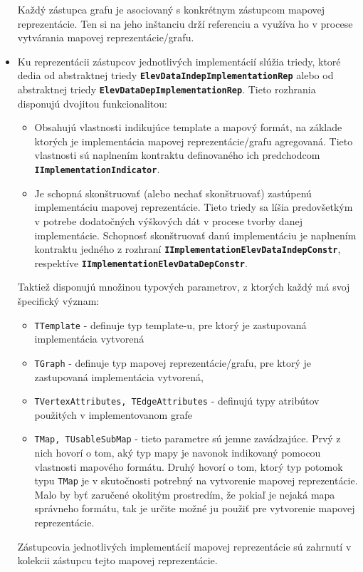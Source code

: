 \begin{itemize}
    Každý zástupca grafu je asociovaný s konkrétnym zástupcom mapovej reprezentácie. Ten si na jeho inštanciu drží referenciu a využíva ho v procese vytvárania mapovej reprezentácie/grafu.

    \item Ku reprezentácii zástupcov jednotlivých implementácií slúžia triedy, ktoré dedia od abstraktnej triedy \textbf{\texttt{ElevDataIndepImplementationRep}} alebo od abstraktnej triedy \textbf{\texttt{ElevDataDepImplementationRep}}. Tieto rozhrania disponujú dvojitou funkcionalitou:
    \begin{itemize}
        \item Obsahujú vlastnosti indikujúce template a mapový formát, na základe ktorých je implementácia mapovej reprezentácie/grafu agregovaná. Tieto vlastnosti sú naplnením kontraktu definovaného ich predchodcom \textbf{\texttt{IImplementationIndicator}}.
        \item Je schopná skonštruovať (alebo nechať skonštruovať) zastúpenú implementáciu mapovej reprezentácie. Tieto triedy sa líšia predovšetkým v potrebe dodatočných výškových dát v procese tvorby danej implementácie. Schopnosť skonštruovať danú implementáciu je naplnením kontraktu jedného z rozhraní \textbf{\texttt{IImplementationElevDataIndepConstr}}, respektíve \textbf{\texttt{IImplementationElevDataDepConstr}}. 
    \end{itemize}
    Taktiež disponujú množinou typových parametrov, z ktorých každý má svoj špecifický význam:
    \begin{itemize}
        \item \texttt{TTemplate} - definuje typ template-u, pre ktorý je zastupovaná implementácia vytvorená
        \item \texttt{TGraph} - definuje typ mapovej reprezentácie/grafu, pre ktorý je zastupovaná implementácia vytvorená,
        \item \texttt{TVertexAttributes, TEdgeAttributes} - definujú typy atribútov použitých v implementovanom grafe
        \item \texttt{TMap, TUsableSubMap} - tieto parametre sú jemne zavádzajúce. Prvý z nich hovorí o tom, aký typ mapy je navonok indikovaný pomocou vlastnosti mapového formátu. Druhý hovorí o tom, ktorý typ potomok typu \texttt{TMap} je v skutočnosti potrebný na vytvorenie mapovej reprezentácie. Malo by byť zaručené okolitým prostredím, že pokiaľ je nejaká mapa správneho formátu, tak je určite možné ju použiť pre vytvorenie mapovej reprezentácie. 
    \end{itemize}
    
    Zástupcovia jednotlivých implementácií mapovej reprezentácie sú zahrnutí v kolekcii zástupcu tejto mapovej reprezentácie.

\end{itemize}

